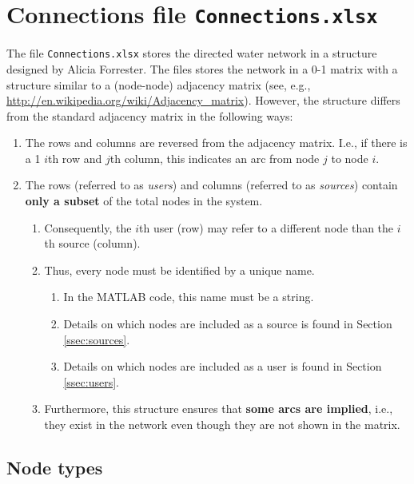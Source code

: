 \documentclass[11pt]{article}
\newcommand{\connections}{\texttt{Connections.xlsx}}
\begin{document}
\section{Connections file \connections}
\label{sec:connectionsxlsx}

The file \texttt{Connections.xlsx} stores the directed water network in a structure designed by Alicia Forrester.
The files stores the network in a 0-1 matrix with a structure similar to a (node-node) adjacency matrix (see, e.g., \url{http://en.wikipedia.org/wiki/Adjacency_matrix}).
However, the structure differs from the standard adjacency matrix in the following ways:
\begin{enumerate}
	\item The rows and columns are reversed from the adjacency matrix.
		I.e., if there is a 1 $i$th row and $j$th column, this indicates an arc from node $j$ to node $i$.
	\item The rows (referred to as \emph{users}) and columns (referred to as \emph{sources}) contain \textbf{only a subset} of the total nodes in the system.
	\begin{enumerate}
		\item Consequently, the $i$th user (row) may refer to a different node than the $i$th source (column).
		\item Thus, every node must be identified by a unique name.
		\begin{enumerate}
			\item In the MATLAB code, this name must be a string.
			\item Details on which nodes are included as a source is found in Section \ref{ssec:sources}.
			\item Details on which nodes are included as a user is found in Section \ref{ssec:users}.
		\end{enumerate}
		\item Furthermore, this structure ensures that \textbf{some arcs are implied}, i.e., they exist in the network even though they are not shown in the matrix.
	\end{enumerate}
\end{enumerate}

\subsection{Node types}
\label{ssec:nodetypes}
\end{document}
